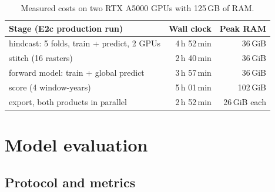 \documentclass[11pt,a4paper]{article}
\begin{document}
\begin{table}[h]
\centering\small
\begin{tabular}{@{}lrr@{}}
\toprule
Stage (E2c production run) & Wall clock & Peak RAM \\
\midrule
hindcast: 5 folds, train + predict, 2 GPUs & 4\,h 52\,min & 36\,GiB \\
stitch (16 rasters) & 2\,h 40\,min & 36\,GiB \\
forward model: train + global predict & 3\,h 57\,min & 36\,GiB \\
score (4 window-years) & 5\,h 01\,min & 102\,GiB \\
export, both products in parallel & 2\,h 52\,min & 26\,GiB each \\
\bottomrule
\end{tabular}
\caption{Measured costs on two RTX A5000 GPUs with 125\,GB of RAM.}
\end{table}

\section{Model evaluation}
\label{sec:eval}

\subsection{Protocol and metrics}
\end{document}
